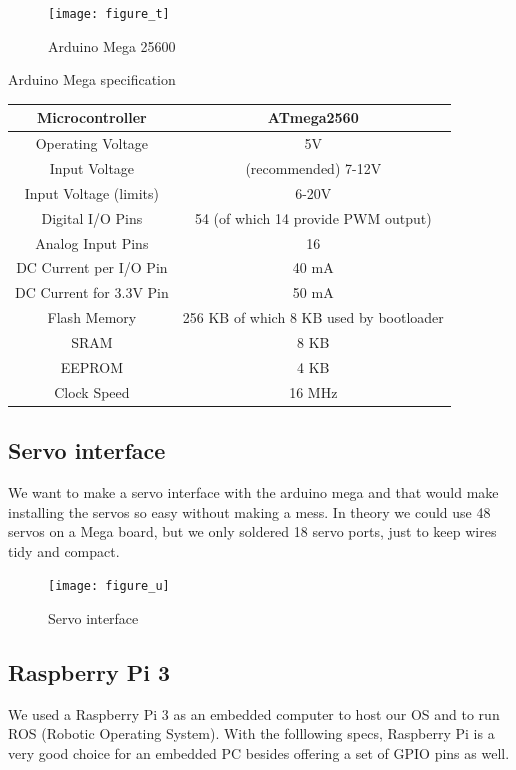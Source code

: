 \begin{figure}[H]
	\centering
	\texttt{[image: figure\_t]}
	\caption{Arduino Mega 25600}
	\label{figure_t}
\end{figure}

	 Arduino Mega specification
\begin{center}
	\begin{tabular}{ |c|c|}
		\hline
		Microcontroller			& ATmega2560 \\ \hline
		Operating Voltage		& 5V\\ \hline
		Input Voltage			& (recommended) 7-12V\\ \hline
		Input Voltage (limits) 	& 6-20V\\ \hline
		Digital I/O Pins 		& 54 (of which 14 provide PWM output)\\ \hline
		Analog Input Pins 		& 16\\ \hline
		DC Current per I/O Pin	& 40 mA\\ \hline
		DC Current for 3.3V Pin & 50 mA\\ \hline
		Flash Memory			& 256 KB of which 8 KB used by bootloader\\ \hline
		SRAM					& 8 KB\\ \hline
		EEPROM 					& 4 KB\\ \hline
		Clock Speed 			& 16 MHz\\ \hline
	\end{tabular}
\end{center}

\subsection{Servo interface}
We want to make a servo interface with the arduino mega and that would make installing the servos so easy without making a mess. In theory we could use 48 servos on a Mega board, but we only soldered 18 servo ports, just to keep wires tidy and compact.

\begin{figure}[H]
	\centering
	\texttt{[image: figure\_u]}
	\caption{Servo interface}
	\label{figure_u}
\end{figure}

\subsection{Raspberry Pi 3}
We used a Raspberry Pi 3 as an embedded computer to host our OS and to run ROS (Robotic Operating System). With the folllowing specs, Raspberry Pi is a very good choice for an embedded PC besides offering a set of GPIO pins as well.

